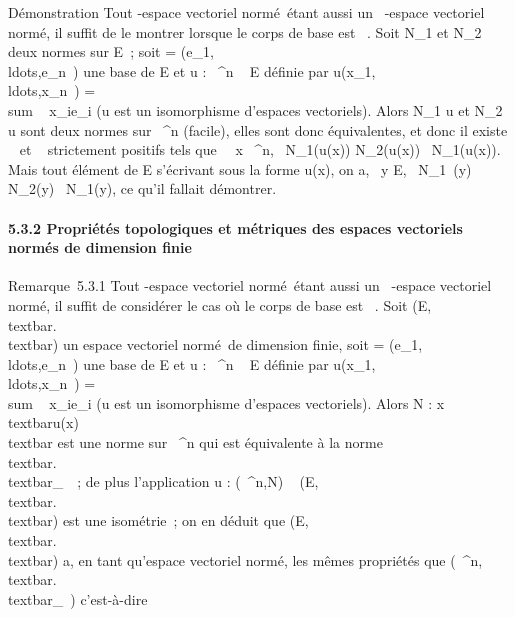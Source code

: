 \documentclass[]{article}
\begin{document}
Démonstration Tout -espace vectoriel normé~étant aussi un ~-espace
vectoriel normé, il suffit de le montrer lorsque le corps de base est ~.
Soit N\_1 et N\_2 deux normes sur E~; soit  =
(e\_1,\\ldots,e\_n~)
une base de E et u : ~^n \rightarrow~ E définie par
u(x\_1,\\ldots,x\_n~)
= \\sum ~
x\_ie\_i (u est un isomorphisme d'espaces vectoriels).
Alors N\_1 \cdot u et N\_2 \cdot u sont deux normes sur
~^n (facile), elles sont donc équivalentes, et donc il existe
\alpha~ et \beta~ strictement positifs tels que \forall~~x \in
{}~^n, \alpha~N\_1(u(x)) \leq N\_2(u(x)) \leq
\beta~N\_1(u(x)). Mais tout élément de E s'écrivant sous la forme
u(x), on a, \forall~y \in E, \alpha~N\_1~(y) \leq
N\_2(y) \leq \beta~N\_1(y), ce qu'il fallait démontrer.

\paragraph{5.3.2 Propriétés topologiques et métriques des espaces
vectoriels normés de dimension finie}

Remarque~5.3.1 Tout -espace vectoriel normé~étant aussi un ~-espace
vectoriel normé, il suffit de considérer le cas où le corps de base est
~. Soit (E,\\textbar{}.\\textbar{}) un
espace vectoriel normé~de dimension finie, soit  =
(e\_1,\\ldots,e\_n~)
une base de E et u : ~^n \rightarrow~ E définie par
u(x\_1,\\ldots,x\_n~)
= \\sum ~
x\_ie\_i (u est un isomorphisme d'espaces vectoriels).
Alors N :
x\mapsto~\\textbar{}u(x)\\textbar{}
est une norme sur ~^n qui est équivalente à la norme
\\textbar{}.\\textbar{}\_\infty~~; de
plus l'application u : (~^n,N) \rightarrow~
(E,\\textbar{}.\\textbar{}) est une
isométrie~; on en déduit que
(E,\\textbar{}.\\textbar{}) a, en tant
qu'espace vectoriel normé, les mêmes propriétés que
(~^n,\\textbar{}.\\textbar{}\_\infty~)
c'est-à-dire
\end{document}
